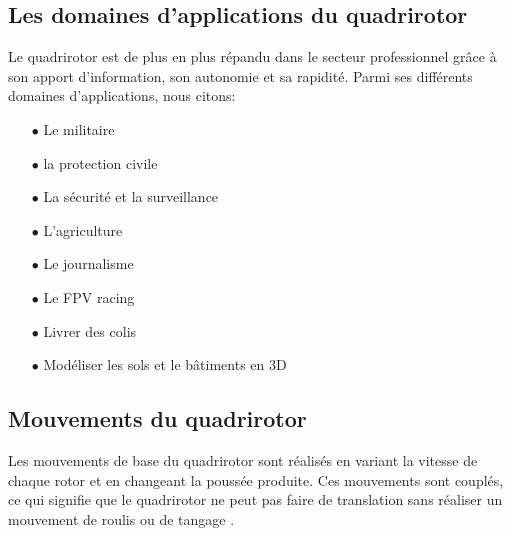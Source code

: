\subsection{Les domaines d'applications du quadrirotor}

Le quadrirotor est de plus en plus répandu dans le secteur professionnel grâce à son apport d'information, son autonomie et sa rapidité. Parmi ses différents domaines d'applications, nous citons: 

\begin{itemize}

\item [$\bullet$]Le militaire 
\item [$\bullet$]la protection civile
\item [$\bullet$]La sécurité et la surveillance
\item [$\bullet$]L'agriculture
\item [$\bullet$]Le journalisme
\item [$\bullet$]Le FPV racing
\item [$\bullet$]Livrer des colis
 \item [$\bullet$]Modéliser les sols et le bâtiments en 3D
\end{itemize}

\subsection{Mouvements du quadrirotor}
Les mouvements de base du quadrirotor sont réalisés en variant la vitesse de chaque rotor et en changeant la poussée produite. Ces mouvements sont couplés, ce qui signifie que le quadrirotor ne peut pas faire de translation sans réaliser un mouvement de roulis ou de tangage \cite{WikiMemoires}.

